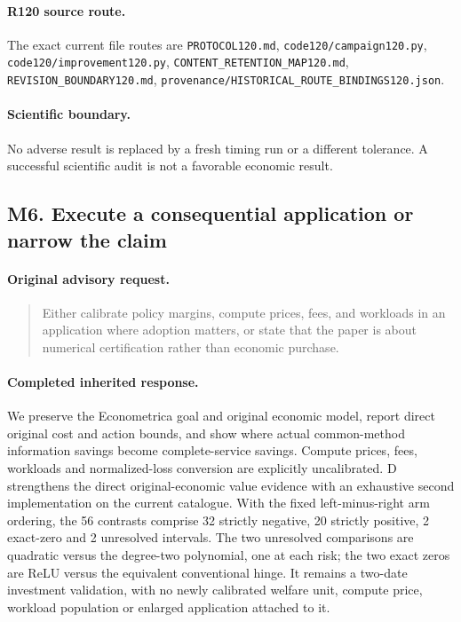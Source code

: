 \paragraph{R120 source route.}
The exact current file routes are \nolinkurl{PROTOCOL120.md}, \nolinkurl{code120/campaign120.py}, \nolinkurl{code120/improvement120.py}, \nolinkurl{CONTENT_RETENTION_MAP120.md}, \nolinkurl{REVISION_BOUNDARY120.md}, \nolinkurl{provenance/HISTORICAL_ROUTE_BINDINGS120.json}.
\paragraph{Scientific boundary.}
No adverse result is replaced by a fresh timing run or a different tolerance. A successful scientific audit is not a favorable economic result.

\subsection{M6. Execute a consequential application or narrow the claim}
\label{response120:M6}
\paragraph{Original advisory request.}
\begin{quote}
Either calibrate policy margins, compute prices, fees, and workloads in an application where adoption matters, or state that the paper is about numerical certification rather than economic purchase.
\end{quote}
\paragraph{Completed inherited response.}
We preserve the Econometrica goal and original economic model, report direct original cost and action bounds, and show where actual common-method information savings become complete-service savings. Compute prices, fees, workloads and normalized-loss conversion are explicitly uncalibrated. D strengthens the direct original-economic value evidence with an exhaustive second implementation on the current catalogue. With the fixed left-minus-right arm ordering, the 56 contrasts comprise 32 strictly negative, 20 strictly positive, 2 exact-zero and 2 unresolved intervals. The two unresolved comparisons are quadratic versus the degree-two polynomial, one at each risk; the two exact zeros are ReLU versus the equivalent conventional hinge. It remains a two-date investment validation, with no newly calibrated welfare unit, compute price, workload population or enlarged application attached to it.
